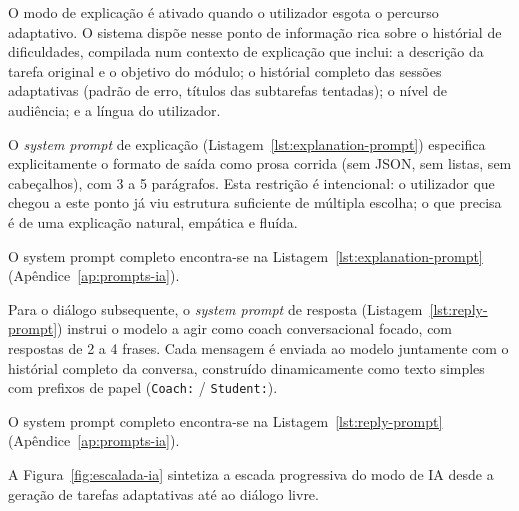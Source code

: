 O modo de explica\c{c}\~ao \'e ativado quando o utilizador esgota o percurso
adaptativo. O sistema disp\~oe nesse ponto de informa\c{c}\~ao rica sobre o
hist\'orial de dificuldades, compilada num contexto de explica\c{c}\~ao que
inclui: a descri\c{c}\~ao da tarefa original e o objetivo do m\'odulo; o
hist\'orial completo das sess\~oes adaptativas (padr\~ao de erro, t\'itulos
das subtarefas tentadas); o n\'ivel de audi\^encia; e a l\'ingua do utilizador.

O \emph{system prompt} de explica\c{c}\~ao (Listagem~\ref{lst:explanation-prompt})
especifica explicitamente o formato de sa\'ida como prosa corrida (sem JSON,
sem listas, sem cabe\c{c}alhos), com 3 a 5 par\'agrafos. Esta restri\c{c}\~ao
\'e intencional: o utilizador que chegou a este ponto j\'a viu estrutura
suficiente de m\'ultipla escolha; o que precisa \'e de uma explica\c{c}\~ao
natural, emp\'atica e flu\'ida.

O system prompt completo encontra-se na Listagem~\ref{lst:explanation-prompt}
(Ap\^endice~\ref{ap:prompts-ia}).

Para o di\'alogo subsequente, o \emph{system prompt} de resposta
(Listagem~\ref{lst:reply-prompt}) instrui o modelo a agir como coach
conversacional focado, com respostas de 2 a 4 frases. Cada mensagem \'e
enviada ao modelo juntamente com o hist\'orial completo da conversa,
constru\'ido dinamicamente como texto simples com prefixos de papel
(\texttt{Coach:} / \texttt{Student:}).

O system prompt completo encontra-se na Listagem~\ref{lst:reply-prompt}
(Ap\^endice~\ref{ap:prompts-ia}).

A Figura~\ref{fig:escalada-ia} sintetiza a escada progressiva do modo de IA
desde a gera\c{c}\~ao de tarefas adaptativas at\'e ao di\'alogo livre.


